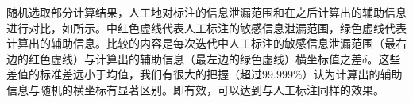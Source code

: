 {{	%
	随机选取部分计算结果，人工地对标注的信息泄漏范围和在\poifanwei 之后计算出的辅助信息进行对比，如所示。中红色虚线代表人工标注的敏感信息泄漏范围，绿色虚线代表计算出的辅助信息。比较的内容是每次迭代中人工标注的敏感信息泄漏范围（最右边的红色虚线）与计算出的辅助信息（最左边的绿色虚线）横坐标值之差$\delta$。这些差值的标准差远小于均值，我们有很大的把握（超过99.999\%）认为计算出的辅助信息与随机的横坐标有显著区别。即\poifanwei 有效，可以达到与人工标注同样的效果。
	
}}

